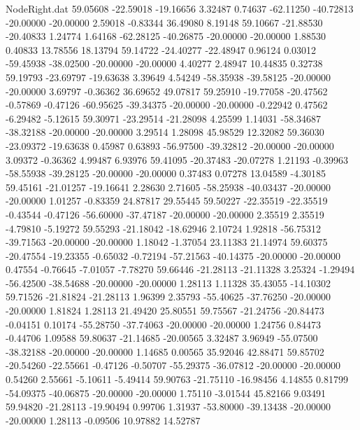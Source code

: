 \begin{filecontents}{NodeRight.dat}
  59.05608  -22.59018  -19.16656     3.32487    0.74637  -62.11250  -40.72813  -20.00000  -20.00000    2.59018   -0.83344   36.49080    8.19148
  59.10667  -21.88530  -20.40833     1.24774    1.64168  -62.28125  -40.26875  -20.00000  -20.00000    1.88530    0.40833   13.78556   18.13794
  59.14722  -24.40277  -22.48947     0.96124    0.03012  -59.45938  -38.02500  -20.00000  -20.00000    4.40277    2.48947   10.44835    0.32738
  59.19793  -23.69797  -19.63638     3.39649    4.54249  -58.35938  -39.58125  -20.00000  -20.00000    3.69797   -0.36362   36.69652   49.07817
  59.25910  -19.77058  -20.47562    -0.57869   -0.47126  -60.95625  -39.34375  -20.00000  -20.00000   -0.22942    0.47562   -6.29482   -5.12615
  59.30971  -23.29514  -21.28098     4.25599    1.14031  -58.34687  -38.32188  -20.00000  -20.00000    3.29514    1.28098   45.98529   12.32082
  59.36030  -23.09372  -19.63638     0.45987    0.63893  -56.97500  -39.32812  -20.00000  -20.00000    3.09372   -0.36362    4.99487    6.93976
  59.41095  -20.37483  -20.07278     1.21193   -0.39963  -58.55938  -39.28125  -20.00000  -20.00000    0.37483    0.07278   13.04589   -4.30185
  59.45161  -21.01257  -19.16641     2.28630    2.71605  -58.25938  -40.03437  -20.00000  -20.00000    1.01257   -0.83359   24.87817   29.55445
  59.50227  -22.35519  -22.35519    -0.43544   -0.47126  -56.60000  -37.47187  -20.00000  -20.00000    2.35519    2.35519   -4.79810   -5.19272
  59.55293  -21.18042  -18.62946     2.10724    1.92818  -56.75312  -39.71563  -20.00000  -20.00000    1.18042   -1.37054   23.11383   21.14974
  59.60375  -20.47554  -19.23355    -0.65032   -0.72194  -57.21563  -40.14375  -20.00000  -20.00000    0.47554   -0.76645   -7.01057   -7.78270
  59.66446  -21.28113  -21.11328     3.25324   -1.29494  -56.42500  -38.54688  -20.00000  -20.00000    1.28113    1.11328   35.43055  -14.10302
  59.71526  -21.81824  -21.28113     1.96399    2.35793  -55.40625  -37.76250  -20.00000  -20.00000    1.81824    1.28113   21.49420   25.80551
  59.75567  -21.24756  -20.84473    -0.04151    0.10174  -55.28750  -37.74063  -20.00000  -20.00000    1.24756    0.84473   -0.44706    1.09588
  59.80637  -21.14685  -20.00565     3.32487    3.96949  -55.07500  -38.32188  -20.00000  -20.00000    1.14685    0.00565   35.92046   42.88471
  59.85702  -20.54260  -22.55661    -0.47126   -0.50707  -55.29375  -36.07812  -20.00000  -20.00000    0.54260    2.55661   -5.10611   -5.49414
  59.90763  -21.75110  -16.98456     4.14855    0.81799  -54.09375  -40.06875  -20.00000  -20.00000    1.75110   -3.01544   45.82166    9.03491
  59.94820  -21.28113  -19.90494     0.99706    1.31937  -53.80000  -39.13438  -20.00000  -20.00000    1.28113   -0.09506   10.97882   14.52787

\end{filecontents}

